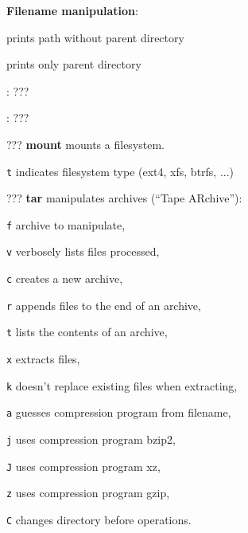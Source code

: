 \textbf{Filename manipulation}:
\begin{compactenum}
	\item [\symbolcoreutils]  prints path without parent directory

	\item [\symbolcoreutils]  prints only parent directory

	\item [\symbolcoreutils] : \dotfill ???

	\item [\symbolcoreutils] : \dotfill ???
\end{compactenum}

\begin{compactenum}
	\item [???] \textbf{mount} mounts a filesystem.
	\item [\texttt{t}] indicates filesystem type (ext4, xfs, btrfs, ...)
\end{compactenum}

\begin{compactenum}
	\item [???] \textbf{tar} manipulates archives (``Tape ARchive''):
	\item [\texttt{f}] archive to manipulate,
	\item [\texttt{v}] verbosely lists files processed,
	\item [\texttt{c}] creates a new archive,
	\item [\texttt{r}] appends files to the end of an archive,
	\item [\texttt{t}] lists the contents of an archive,
	\item [\texttt{x}] extracts files,
	\item [\texttt{k}] doesn't replace existing files when extracting,
	\item [\texttt{a}] guesses compression program from filename,
	\item [\texttt{j}] uses compression program bzip2,
	\item [\texttt{J}] uses compression program xz,
	\item [\texttt{z}] uses compression program gzip,
	\item [\texttt{C}] changes directory before operations.
\end{compactenum}

